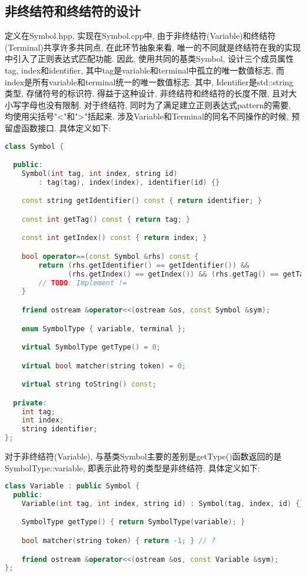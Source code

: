 \subsection{非终结符和终结符的设计}
定义在Symbol.hpp, 实现在Symbol.cpp中, 由于非终结符(Variable)和终结符(Terminal)共享许多共同点, 在此环节抽象来看,
唯一的不同就是终结符在我的实现中引入了正则表达式匹配功能. 因此,
使用共同的基类Symbol, 设计三个成员属性tag, index和identifier,
其中tag是variable和terminal中孤立的唯一数值标志,
而index是所有variable和terminal统一的唯一数值标志.
其中, Identifier是std::string类型, 存储符号的标识符. 得益于这种设计,
非终结符和终结符的长度不限, 且对大小写字母也没有限制. 对于终结符,
同时为了满足建立正则表达式pattern的需要, 均使用尖括号"<"和">"括起来.
涉及Variable和Terminal的同名不同操作的时候, 预留虚函数接口. 具体定义如下:
\begin{lstlisting}[language=c++]
class Symbol {

  public:
    Symbol(int tag, int index, string id)
        : tag(tag), index(index), identifier(id) {}

    const string getIdentifier() const { return identifier; }

    const int getTag() const { return tag; }

    const int getIndex() const { return index; }

    bool operator==(const Symbol &rhs) const {
        return (rhs.getIdentifier() == getIdentifier()) &&
               (rhs.getIndex() == getIndex()) && (rhs.getTag() == getTag());
        // TODO: Implement !=
    }

    friend ostream &operator<<(ostream &os, const Symbol &sym);

    enum SymbolType { variable, terminal };

    virtual SymbolType getType() = 0;

    virtual bool matcher(string token) = 0;

    virtual string toString() const;

  private:
    int tag;
    int index;
    string identifier;
};
\end{lstlisting}

对于非终结符(Variable),
与基类Symbol主要的差别是getType()函数返回的是SymbolType::variable,
即表示此符号的类型是非终结符. 具体定义如下:
\begin{lstlisting}[language=c++]
class Variable : public Symbol {
  public:
    Variable(int tag, int index, string id) : Symbol(tag, index, id) {}

    SymbolType getType() { return SymbolType(variable); }

    bool matcher(string token) { return -1; } // ?

    friend ostream &operator<<(ostream &os, const Variable &sym);
};
\end{lstlisting}


